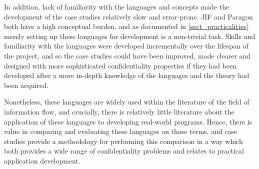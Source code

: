 In addition, lack of familiarity with the languages and concepts made the development of the case studies relatively slow and error-prone. JIF and Paragon both have a high conceptual burden, and as documented in \ref{sect_practicalities} merely setting up these languages for development is a non-trivial task. Skills and familiarity with the languages were developed incrementally over the lifespan of the project, and so the case studies could have been improved, made clearer and designed with more sophisticated confidentiality properties if they had been developed after a more in-depth knowledge of the languages and the theory had been acquired.

Nonetheless, these languages are widely used within the literature of the field of information flow, and crucially, there is relatively little literature about the application of these languages to developing real-world programs. Hence, there is value in comparing and evaluating these languages on those terms, and case studies provide a methodology for performing this comparison in a way which both provides a wide range of confidentiality problems and relates to practical application development.

